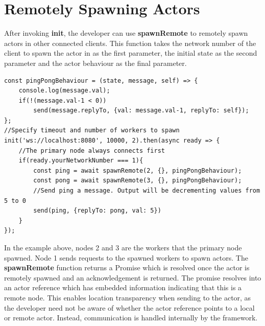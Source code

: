 \documentclass[12pt, a4paper]{report}
\theoremstyle{definition}
\theoremstyle{definition}%
\theoremstyle{definition}%
\theoremstyle{definition}%
\theoremstyle{definition}%
\theoremstyle{definition}%
\begin{document}
\section{Remotely Spawning Actors}
After invoking \textbf{init}, the developer can use \textbf{spawnRemote} to remotely spawn actors in other connected clients. This function takes the network number of the client to spawn the actor in as the first parameter, the initial state as the second parameter and the actor behaviour as the final parameter.
\begin{lstlisting}
const pingPongBehaviour = (state, message, self) => {
    console.log(message.val);
    if(!(message.val-1 < 0))
        send(message.replyTo, {val: message.val-1, replyTo: self});
};
//Specify timeout and number of workers to spawn
init('ws://localhost:8080', 10000, 2).then(async ready => {
    //The primary node always connects first
    if(ready.yourNetworkNumber === 1){
        const ping = await spawnRemote(2, {}, pingPongBehaviour);
        const pong = await spawnRemote(3, {}, pingPongBehaviour);
        //Send ping a message. Output will be decrementing values from 5 to 0
        send(ping, {replyTo: pong, val: 5})
    }
});
\end{lstlisting}
In the example above, nodes 2 and 3 are the workers that the primary node spawned. Node 1 sends requests to the spawned workers to spawn actors. The \textbf{spawnRemote} function returns a Promise which is resolved once the actor is remotely spawned and an acknowledgement is returned. The promise resolves into an actor reference which has embedded information indicating that this is a remote node. This enables location transparency when sending to the actor, as the developer need not be aware of whether the actor reference points to a local or remote actor. Instead, communication is handled internally by the framework.


\bibliomatter





 
\end{document}
